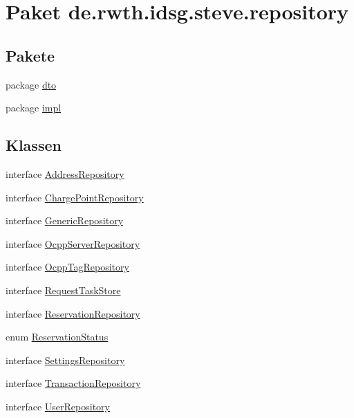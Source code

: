 \hypertarget{namespacede_1_1rwth_1_1idsg_1_1steve_1_1repository}{\section{Paket de.\-rwth.\-idsg.\-steve.\-repository}
\label{namespacede_1_1rwth_1_1idsg_1_1steve_1_1repository}
}
\subsection*{Pakete}
\begin{DoxyCompactItemize}
\item 
package \hyperlink{namespacede_1_1rwth_1_1idsg_1_1steve_1_1repository_1_1dto}{dto}
\item 
package \hyperlink{namespacede_1_1rwth_1_1idsg_1_1steve_1_1repository_1_1impl}{impl}
\end{DoxyCompactItemize}
\subsection*{Klassen}
\begin{DoxyCompactItemize}
\item 
interface \hyperlink{interfacede_1_1rwth_1_1idsg_1_1steve_1_1repository_1_1_address_repository}{Address\-Repository}
\item 
interface \hyperlink{interfacede_1_1rwth_1_1idsg_1_1steve_1_1repository_1_1_charge_point_repository}{Charge\-Point\-Repository}
\item 
interface \hyperlink{interfacede_1_1rwth_1_1idsg_1_1steve_1_1repository_1_1_generic_repository}{Generic\-Repository}
\item 
interface \hyperlink{interfacede_1_1rwth_1_1idsg_1_1steve_1_1repository_1_1_ocpp_server_repository}{Ocpp\-Server\-Repository}
\item 
interface \hyperlink{interfacede_1_1rwth_1_1idsg_1_1steve_1_1repository_1_1_ocpp_tag_repository}{Ocpp\-Tag\-Repository}
\item 
interface \hyperlink{interfacede_1_1rwth_1_1idsg_1_1steve_1_1repository_1_1_request_task_store}{Request\-Task\-Store}
\item 
interface \hyperlink{interfacede_1_1rwth_1_1idsg_1_1steve_1_1repository_1_1_reservation_repository}{Reservation\-Repository}
\item 
enum \hyperlink{enumde_1_1rwth_1_1idsg_1_1steve_1_1repository_1_1_reservation_status}{Reservation\-Status}
\item 
interface \hyperlink{interfacede_1_1rwth_1_1idsg_1_1steve_1_1repository_1_1_settings_repository}{Settings\-Repository}
\item 
interface \hyperlink{interfacede_1_1rwth_1_1idsg_1_1steve_1_1repository_1_1_transaction_repository}{Transaction\-Repository}
\item 
interface \hyperlink{interfacede_1_1rwth_1_1idsg_1_1steve_1_1repository_1_1_user_repository}{User\-Repository}
\end{DoxyCompactItemize}
